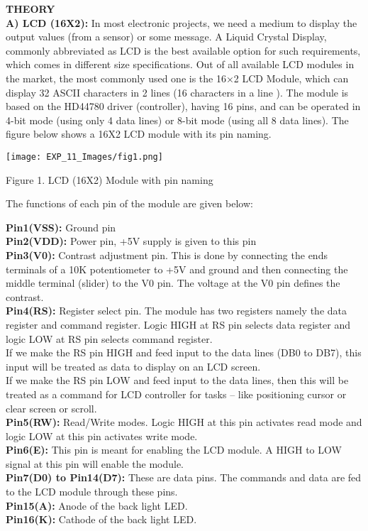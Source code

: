 \documentclass[12pt,a4paper]{article}
\begin{document}
\begin{justify}
\textbf{\large THEORY}\\[3pt]
\textbf{A)	LCD (16X2): } In most electronic projects, we need a medium to display the output values (from a sensor) or some message. A Liquid Crystal Display,  commonly abbreviated as LCD is the best available option for such requirements, which comes in different size specifications. Out of all available LCD modules in the market, the most commonly used one is the 16×2 LCD Module, which can display 32 ASCII characters in 2 lines (16 characters in a line ). The module is based on the HD44780 driver (controller), having  16 pins, and can be operated in 4-bit mode (using only 4 data lines) or 8-bit mode (using all 8 data lines). The figure below shows a  16X2 LCD module with its pin naming.

\begin{center} 
\texttt{[image: EXP\_11\_Images/fig1.png]}
\end{center}
\begin{center} {Figure 1. LCD (16X2) Module with pin naming}\end{center}

\noindent The functions of each pin of the module are given below: 

\noindent \textbf{Pin1(VSS):} Ground pin \\
\textbf{Pin2(VDD):} Power pin, +5V supply is given to this pin\\
\textbf{Pin3(V0): }Contrast adjustment pin. This is done by connecting the ends terminals of a 10K potentiometer to +5V and ground and then connecting the middle terminal (slider) to the V0 pin. The voltage at the V0 pin defines the contrast.\\
\textbf{Pin4(RS):} Register select pin. The module has two registers namely the data register and command register. Logic HIGH at RS pin selects data register and logic LOW at RS pin selects command register. \\
If we make the RS pin HIGH and feed input to the data lines (DB0 to DB7), this input will be treated as data to display on an LCD screen.\\
If we make the RS pin LOW and feed input to the data lines, then this will be treated as a command for LCD controller for tasks – like positioning cursor or clear screen or scroll.\\
\textbf{Pin5(RW):} Read/Write modes. Logic HIGH at this pin activates read mode and logic LOW at this pin activates write mode.\\
\textbf{Pin6(E):} This pin is meant for enabling the LCD module. A HIGH to LOW signal at this pin will enable the module.\\
\textbf{Pin7(D0) to Pin14(D7): }These are data pins. The commands and data are fed to the LCD module through these pins.\\
\textbf{Pin15(A):} Anode of the back light LED. \\
\textbf{Pin16(K):} Cathode of the back light LED.\\


\end{justify}
\end{document}
